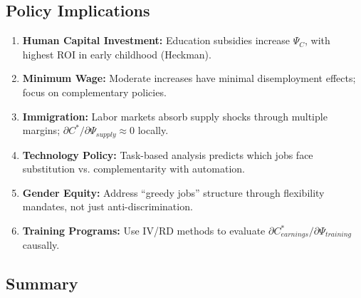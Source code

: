 \subsection{Policy Implications}
\label{sec:aa-implications}

\begin{enumerate}
    \item \textbf{Human Capital Investment:} Education subsidies increase $\Psi_C$, with highest ROI in early childhood (Heckman).

    \item \textbf{Minimum Wage:} Moderate increases have minimal disemployment effects; focus on complementary policies.

    \item \textbf{Immigration:} Labor markets absorb supply shocks through multiple margins; $\partial C^*/\partial \Psi_{supply} \approx 0$ locally.

    \item \textbf{Technology Policy:} Task-based analysis predicts which jobs face substitution vs. complementarity with automation.

    \item \textbf{Gender Equity:} Address ``greedy jobs'' structure through flexibility mandates, not just anti-discrimination.

    \item \textbf{Training Programs:} Use IV/RD methods to evaluate $\partial C^*_{earnings}/\partial \Psi_{training}$ causally.
\end{enumerate}

\subsection{Summary}
\label{sec:aa-summary}

